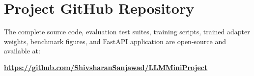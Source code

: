 \documentclass[11pt,a4paper]{report}
\begin{document}
\section{Project GitHub Repository}
The complete source code, evaluation test suites, training scripts, trained adapter weights, benchmark figures, and FastAPI application are open-source and available at:
\begin{center}
\vspace{0.4cm}
\Large \textbf{\url{https://github.com/ShivsharanSanjawad/LLMMiniProject}}
\vspace{0.4cm}
\end{center}
\end{document}
